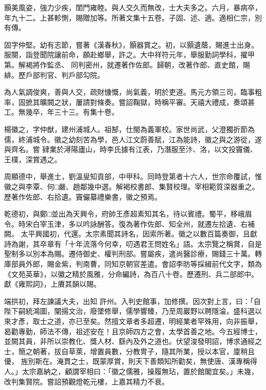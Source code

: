 \begin{pinyinscope}
 顥美風姿，強力少疾，閨門雍睦。與人交久而無改，士大夫多之。六月，暴病卒，年九十二。上甚軫惻，賜贈加等。所著文集十五卷。子固、述、適。適相仁宗，別有傳。



 固字仲堅。幼有志節，嘗著《漢春秋》，顥器賞之。初，以顥遺蔭，賜進士出身。服闋，詣登聞院讓前命，願赴鄉舉，許之。大中祥符元年，舉服勤詞學科，擢甲第。解褐將作監丞、
 同判密州，就遷著作佐郎。歸朝，改著作郎、直史館，賜緋。歷戶部判官、判戶部勾院。



 為人氣調俊爽，善與人交，疏財慷慨，尚氣義，明於吏道。馬元方領三司，臨事粗率，固摭其曠闕之狀，屢請對條奏。嘗詔鞠獄，時稱平審。天禧大禮成，奏頌甚工。無幾卒，年三十三。有集十卷。



 楊徽之，字仲猷，建州浦城人。祖郜，仕閩為義軍校。家世尚武，父澄獨折節為儒，終浦城令。徽之幼刻苦為學，邑人江文蔚善賦，江為能詩，徽之與之游從，遂與齊名。嘗
 肄業於潯陽廬山，時李氏據有江表，乃潛服至汴、洛，以文投竇儀、王樸，深賞遇之。



 周顯德中，舉進士，劉溫叟知貢部，中甲科。同時登第者十六人，世宗命覆試，惟徽之與李覃、何□嚴、趙鄰幾中選。解褐校書郎、集賢校理。宰相範質深器重之。歷著作佐郎、右拾遺。竇儼纂禮樂書，徽之預焉。



 乾德初，與鄭□並出為天興令，府帥王彥超素知其名，待以賓禮。蜀平，移峨眉令。時宋白宰玉津，多以吟詠酬答。復為著作佐郎、知全州，就遷左拾遺、右補闕。
 太平興國初，代還。太宗素聞其詩名，因索所著。徽之以數百篇奏御，且獻詩為謝，其卒章有「十年流落今何幸，叨遇君王問姓名」語。太宗覽之稱賞，自是聖制多以別本為賜。遷侍御史、權判刑部。嘗屬疾，遣尚醫診療，賜錢三十萬。轉庫部員外郎，賜金紫，判南曹，同知京朝官差遣。會詔李昉等採緝前代文字，類為《文苑英華》，以徽之精於風雅，分命編詩，為百八十卷。歷遷刑、兵二部郎中。獻《雍熙詞》，上賡其韻以賜。



 端拱初，拜左諫議大夫，出知
 許州。入判史館事，加修撰。因次對上言，曰：「自陛下嗣統鴻圖，闡揚文治，廢墜修舉，儒學響臻，乃至周巖野以聘隱淪，盛科選以來才彥，取士之道，亦已至矣。然擅文章者多超遷，明經業者罕殊用，向非振舉，曷勸專勤，師法不傳，祖述安在！且京師四方之會，太學首善之地。今五經博士，並闕其員，非所以崇教化、獎人材、繇內及外之道也。伏望浚發明詔，博求通經之士，簡之朝著，拔自草萊，增置員數，分教冑子，隨其所業，授以本官，廩稍且優，
 旌別斯在。淹貫之士，既蒙厚賞，則天下善類知所勸矣，無使唐、漢專稱得人。」太宗嘉納之，顧謂宰相曰：「徽之儒雅，操履無玷，置於館閣宜矣。」未幾，改判集賢院。嘗詔預觀燈乾元樓，上嘉其精力不衰。




\end{pinyinscope}
